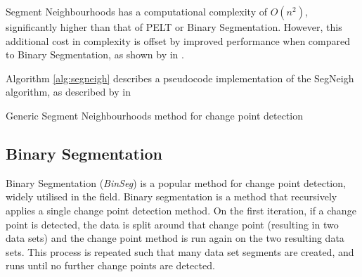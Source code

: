 \documentclass[../main.tex]{subfiles}
\begin{document}
Segment Neighbourhoods has a computational complexity of $O(n^2)$, significantly higher than that of PELT or Binary Segmentation. However, this additional cost in complexity is offset by improved performance when compared to Binary Segmentation, as shown by \citeauthor{Braun2000} in  \cite{Braun2000}.

Algorithm \autoref{alg:segneigh} describes a pseudocode implementation of the SegNeigh algorithm, as described by \citeauthor{Eckley2011} in  \cite{Eckley2011}\newline

\begin{algorithm}[H]
\label{alg:segneigh}
    \caption{Generic Segment Neighbourhoods method for change point detection}
    \DontPrintSemicolon
        
    \bigskip
        
\end{algorithm}

\subsection{Binary Segmentation}

Binary Segmentation \cite{Jackson2003, Yao1984} (\emph{BinSeg}) is a popular method for change point detection, widely utilised in the field. Binary segmentation is a method that recursively applies a single change point detection method. On the first iteration, if a change point is detected, the data is split around that change point (resulting in two data sets) and the change point method is run again on the two resulting data sets. This process is repeated such that many data set segments are created, and runs until no further change points are detected.
\end{document}
